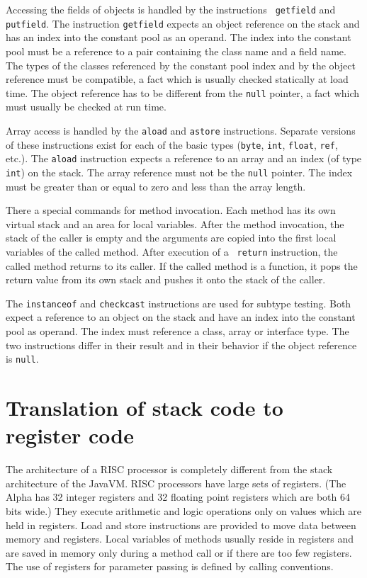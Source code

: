 Accessing the fields of objects is handled by the instructions {\tt
getfield} and {\tt putfield}. The instruction {\tt getfield} expects an
object reference on the stack and has an index into the constant pool as an
operand. The index into the constant pool must be a reference to a pair
containing the class name and a field name. The types of the classes
referenced by the constant pool index and by the object reference must be
compatible, a fact which is usually checked statically at load time. The
object reference has to be different from the {\tt null} pointer, a fact
which must usually be checked at run time.

Array access is handled by the {\tt aload} and {\tt astore} instructions.
Separate versions of these instructions exist for each of the basic types
({\tt byte}, {\tt int}, {\tt float}, {\tt ref}, etc.). The {\tt aload}
instruction expects a reference to an array and an index (of type {\tt
int}) on the stack. The array reference must not be the {\tt null} pointer.
The index must be greater than or equal to zero and less than the array
length.

There a special commands for method invocation. Each method has its own
virtual stack and an area for local variables. After the method invocation,
the stack of the caller is empty and the arguments are copied into the
first local variables of the called method. After execution of a {\tt
return} instruction, the called method returns to its caller. If the called
method is a function, it pops the return value from its own stack and
pushes it onto the stack of the caller.

The {\tt instanceof} and {\tt checkcast} instructions are used for subtype
testing. Both expect a reference to an object on the stack and have an
index into the constant pool as operand. The index must reference a class,
array or interface type. The two instructions differ in their result and in
their behavior if the object reference is {\tt null}.


\section{Translation of stack code to register code}

\label{chaptranslation}

The architecture of a RISC processor is completely different from the stack
architecture of the JavaVM. RISC processors have large sets of registers.
(The Alpha has 32 integer registers and 32 floating point registers which
are both 64 bits wide.) They execute arithmetic and logic operations only
on values which are held in registers. Load and store instructions are
provided to move data between memory and registers. Local variables of
methods usually reside in registers and are saved in memory only during a
method call or if there are too few registers. The use of registers for
parameter passing is defined by calling conventions.

